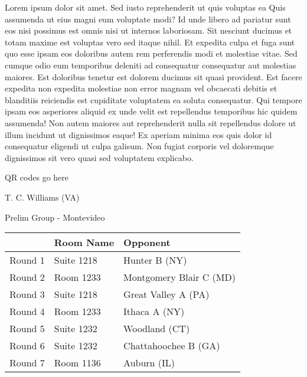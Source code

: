 \documentclass{article}%
\begin{document}
\vspace*{8pt}%
\linebreak%
\newline%
\newline%
Lorem ipsum dolor sit amet. Sed iusto reprehenderit ut quis voluptas ea Quis assumenda ut eius magni eum voluptate modi? Id unde libero ad pariatur sunt eos nisi possimus est omnis nisi ut internos laboriosam. Sit nesciunt ducimus et totam maxime est voluptas vero sed itaque nihil. Et expedita culpa et fuga sunt quo esse ipsam eos doloribus autem rem perferendis modi et molestiae vitae.\newline%
\newline%
Sed cumque odio eum temporibus deleniti ad consequatur consequatur aut molestias maiores. Est doloribus tenetur est dolorem ducimus sit quasi provident. Est facere expedita non expedita molestiae non error magnam vel obcaecati debitis et blanditiis reiciendis est cupiditate voluptatem ea soluta consequatur. Qui tempore ipsam eos asperiores aliquid ex unde velit est repellendus temporibus hic quidem assumenda!\newline%
\newline%
Non autem maiores aut reprehenderit nulla sit repellendus dolore ut illum incidunt ut dignissimos eaque! Ex aperiam minima eos quis dolor id consequatur eligendi ut culpa galisum. Non fugiat corporis vel doloremque dignissimos sit vero quasi sed voluptatem explicabo.\newline%
\newline%
%
\vspace*{30pt}%
\begin{center}%
\begin{Huge}%
QR codes go here%
\end{Huge}%
\end{center}%
\newpage%
%
\begin{center}%
\begin{Huge}%
T. C. Williams (VA)%
\end{Huge}%
\vspace*{8pt}%
\linebreak%
\begin{Large}%
Prelim Group {-} Montevideo%
\end{Large}%
\end{center}%
\begin{tabularx}{\textwidth}{|c|Y|Y|}%
\hline%
&Room Name&Opponent\\%
\hline%
Round 1&Suite 1218&Hunter B (NY)\\%
Round 2&Room 1233&Montgomery Blair C (MD)\\%
Round 3&Suite 1218&Great Valley A (PA)\\%
Round 4&Room 1233&Ithaca A (NY)\\%
Round 5&Suite 1232&Woodland (CT)\\%
Round 6&Suite 1232&Chattahoochee B (GA)\\%
Round 7&Room 1136&Auburn (IL)\\%
\hline%
\end{tabularx}%
\end{document}

